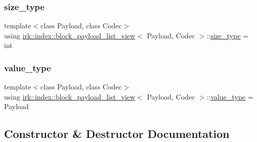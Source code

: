 \subsubsection{\texorpdfstring{size\+\_\+type}{size\_type}}
{\footnotesize\ttfamily template$<$class Payload, class Codec$>$ \\
using \mbox{\hyperlink{classirk_1_1index_1_1block__payload__list__view}{irk\+::index\+::block\+\_\+payload\+\_\+list\+\_\+view}}$<$ Payload, Codec $>$\+::\mbox{\hyperlink{classirk_1_1index_1_1block__payload__list__view_a6b2a03ea0d351acce93c4e52b642b4db}{size\+\_\+type}} =  int}

\mbox{\label{classirk_1_1index_1_1block__payload__list__view_aa7df004298a0dd0b1676007bbd43fe98}} 
\subsubsection{\texorpdfstring{value\+\_\+type}{value\_type}}
{\footnotesize\ttfamily template$<$class Payload, class Codec$>$ \\
using \mbox{\hyperlink{classirk_1_1index_1_1block__payload__list__view}{irk\+::index\+::block\+\_\+payload\+\_\+list\+\_\+view}}$<$ Payload, Codec $>$\+::\mbox{\hyperlink{classirk_1_1index_1_1block__payload__list__view_aa7df004298a0dd0b1676007bbd43fe98}{value\+\_\+type}} =  Payload}



\subsection{Constructor \& Destructor Documentation}
\mbox{\label{classirk_1_1index_1_1block__payload__list__view_af9da50c8dbc7ae9d4544d7b6a367fce6}} 
